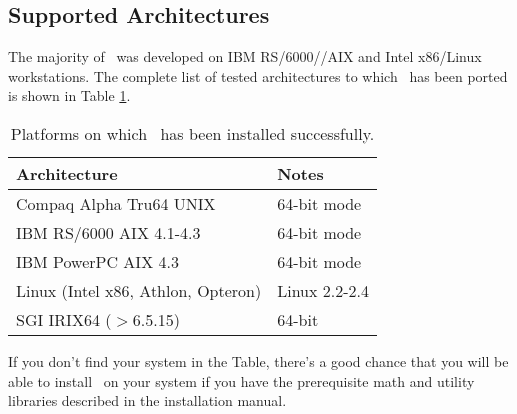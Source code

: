 \subsection{Supported Architectures}
The majority of \PSIthree\ was developed on IBM RS/6000//AIX
and Intel x86/Linux workstations. The complete list of
tested architectures to which \PSIthree\ has
been ported is shown in Table \ref{table:ports}.
\begin{table}[h]
\caption{Platforms on which \PSIthree\ has been installed successfully.}
\label{table:ports}
\begin{center}
\begin{tabular}{ll} \hline\hline
Architecture              &  Notes \\ \hline
Compaq Alpha Tru64 UNIX   & 64-bit mode \\
IBM RS/6000 AIX 4.1-4.3   & 64-bit mode \\
IBM PowerPC AIX 4.3       & 64-bit mode \\
Linux (Intel x86, Athlon, Opteron)  & Linux 2.2-2.4 \\
SGI IRIX64 ($>$6.5.15)    & 64-bit \\ \hline\hline
\end{tabular}
\end{center}
\end{table}
If you don't find your system in the Table, there's a good chance
that you will be able to install \PSIthree\ on your system
if you have the prerequisite math and utility libraries described 
in the installation manual.

